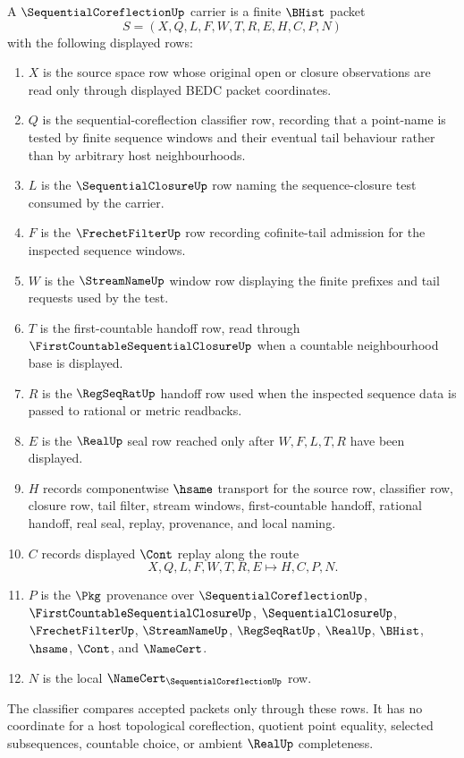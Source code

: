 \begin{definition}
\label{def:sequential-coreflection-carrier}
A $\SequentialCoreflectionUp$ carrier is a finite $\BHist$ packet
$$
S=(X,Q,L,F,W,T,R,E,H,C,P,N)
$$
with the following displayed rows:
\begin{enumerate}
\item $X$ is the source space row whose original open or closure observations are read only through displayed BEDC packet coordinates.
\item $Q$ is the sequential-coreflection classifier row, recording that a point-name is tested by finite sequence windows and their eventual tail behaviour rather than by arbitrary host neighbourhoods.
\item $L$ is the $\SequentialClosureUp$ row naming the sequence-closure test consumed by the carrier.
\item $F$ is the $\FrechetFilterUp$ row recording cofinite-tail admission for the inspected sequence windows.
\item $W$ is the $\StreamNameUp$ window row displaying the finite prefixes and tail requests used by the test.
\item $T$ is the first-countable handoff row, read through $\FirstCountableSequentialClosureUp$ when a countable neighbourhood base is displayed.
\item $R$ is the $\RegSeqRatUp$ handoff row used when the inspected sequence data is passed to rational or metric readbacks.
\item $E$ is the $\RealUp$ seal row reached only after $W,F,L,T,R$ have been displayed.
\item $H$ records componentwise $\hsame$ transport for the source row, classifier row, closure row, tail filter, stream windows, first-countable handoff, rational handoff, real seal, replay, provenance, and local naming.
\item $C$ records displayed $\Cont$ replay along the route
$$
X,Q,L,F,W,T,R,E \longmapsto H,C,P,N .
$$
\item $P$ is the $\Pkg$ provenance over $\SequentialCoreflectionUp$, $\FirstCountableSequentialClosureUp$, $\SequentialClosureUp$, $\FrechetFilterUp$, $\StreamNameUp$, $\RegSeqRatUp$, $\RealUp$, $\BHist$, $\hsame$, $\Cont$, and $\NameCert$.
\item $N$ is the local $\NameCert_{\SequentialCoreflectionUp}$ row.
\end{enumerate}
The classifier compares accepted packets only through these rows. It has no coordinate for a host topological coreflection, quotient point equality, selected subsequences, countable choice, or ambient $\RealUp$ completeness.
\end{definition}


